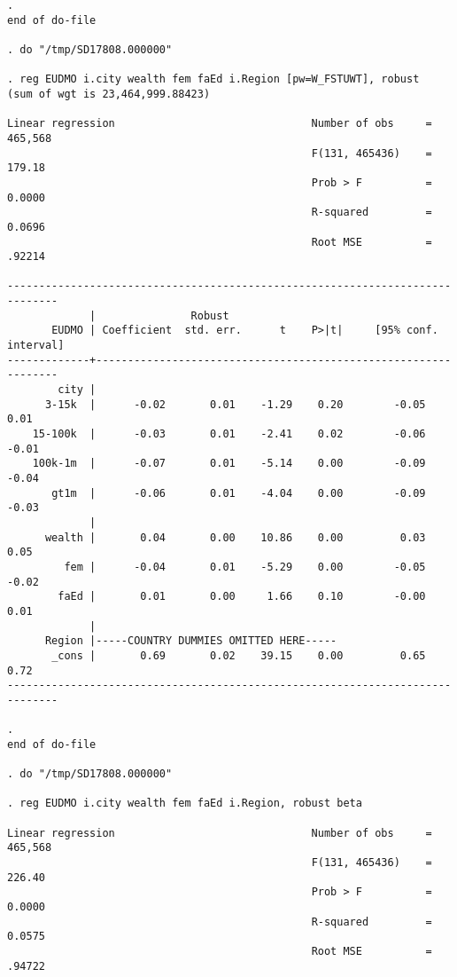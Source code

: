 \documentclass[10pt, letterpaper]{article}
\begin{document}
\begin{spacing}{1.4}
\begin{spacing}{.5}
\begin{scriptsize}
\begin{verbatim}
. 
end of do-file

. do "/tmp/SD17808.000000"

. reg EUDMO i.city wealth fem faEd i.Region [pw=W_FSTUWT], robust
(sum of wgt is 23,464,999.88423)

Linear regression                               Number of obs     =    465,568
                                                F(131, 465436)    =     179.18
                                                Prob > F          =     0.0000
                                                R-squared         =     0.0696
                                                Root MSE          =     .92214

------------------------------------------------------------------------------
             |               Robust
       EUDMO | Coefficient  std. err.      t    P>|t|     [95% conf. interval]
-------------+----------------------------------------------------------------
        city |
      3-15k  |      -0.02       0.01    -1.29    0.20        -0.05        0.01
    15-100k  |      -0.03       0.01    -2.41    0.02        -0.06       -0.01
    100k-1m  |      -0.07       0.01    -5.14    0.00        -0.09       -0.04
       gt1m  |      -0.06       0.01    -4.04    0.00        -0.09       -0.03
             |
      wealth |       0.04       0.00    10.86    0.00         0.03        0.05
         fem |      -0.04       0.01    -5.29    0.00        -0.05       -0.02
        faEd |       0.01       0.00     1.66    0.10        -0.00        0.01
             |
      Region |-----COUNTRY DUMMIES OMITTED HERE-----
       _cons |       0.69       0.02    39.15    0.00         0.65        0.72
------------------------------------------------------------------------------

. 
end of do-file

. do "/tmp/SD17808.000000"

. reg EUDMO i.city wealth fem faEd i.Region, robust beta 

Linear regression                               Number of obs     =    465,568
                                                F(131, 465436)    =     226.40
                                                Prob > F          =     0.0000
                                                R-squared         =     0.0575
                                                Root MSE          =     .94722


\end{verbatim}
\end{scriptsize}
\end{spacing}
\end{spacing}
\end{document}
